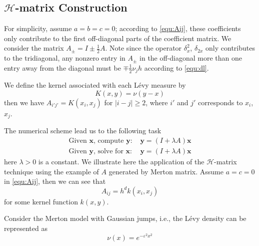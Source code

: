 \documentclass[3p,,preprint,12pt]{elsarticle}
\newcommand{\bx}[0]{\mathbf{x}}
\theoremstyle{definition}
\newcommand{\by}[0]{\mathbf{y}}
\begin{document}
 \subsection{$\mathcal{H}$-matrix Construction} 
 
 For simplicity, assume $a=b=c=0$; according to \cref{equ:Aij}, these coefficients only contribute to the first off-diagonal parts of the coefficient matrix. We consider the matrix $A_\pm = I \pm \frac{1}{2}A$. Note since the operator $\delta_x^2$, $\delta_{2x}$ only contributes to the tridiagonal, any nonzero entry in $A_\pm$ in the off-diagonal more than one entry away from the diagonal must be $\mp\frac{1}{2}\nu_jh$ according to \cref{equ:dl}. 

We define the kernel associated with each L\'evy measure by
\begin{equation}
	K(x,y) = \nu(y-x)
\end{equation}
then we have $A_{i'j'}=K(x_{i},x_{j})$ for $|i-j|\geq 2$, where $i'$ and $j'$ corresponds to $x_{i}$, $x_j$.



 The numerical scheme lead us to the following task
 \begin{align}
 	\mbox{Given $\bx$, compute $\by$: }&\by = (I+\lambda A)\bx\\
 	\mbox{Given $\by$, solve for $\bx$: }&\by = (I+\lambda A)\bx
 \end{align}
 here $\lambda>0$ is a constant. We illustrate here the application of the $\mathcal{H}$-matrix technique using the example of $A$ generated by Merton matrix. Assume $a=c=0$ in \cref{equ:Aij}, then we can see that
 \begin{equation}
 	A_{ij} = h^d k(x_i, x_j)
 \end{equation}
 for some kernel function $k(x,y)$. 
 
Consider the Merton model with Gaussian jumps, i.e., the L\'evy density can be represented as
\begin{equation}
	\nu(x) = e^{-\varepsilon^2 x^2}
\end{equation}
\end{document}
